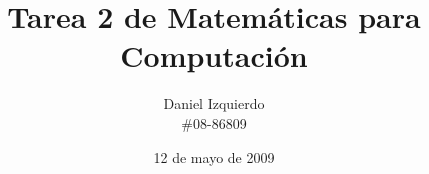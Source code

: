 \documentclass{article}
\begin{document}

\title{Tarea 2 de Matemáticas para Computación}
\author{Daniel Izquierdo \\ \#08-86809}
\date{12 de mayo de 2009}

\maketitle

\section{}
\end{document}
